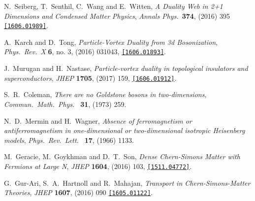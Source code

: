 \begin{thebibliography}{99}
  N.~Seiberg, T.~Senthil, C.~Wang and E.~Witten,
  {\it A Duality Web in 2+1 Dimensions and Condensed Matter Physics},
  {\it Annals Phys.}\  {\bf 374}, (2016) 395 
  \href{https://arxiv.org/abs/1606.01989}{\tt[1606.01989]}.
  
  A.~Karch and D.~Tong,
 {\it Particle-Vortex Duality from 3d Bosonization},
 {\it Phys.\ Rev.\ X} {\bf 6}, no. 3, (2016) 031043, 
  \href{https://arxiv.org/abs/1606.01893}{\tt[1606.01893]}.
  
  J.~Murugan and H.~Nastase,
  {\it Particle-vortex duality in topological insulators and superconductors},
  {\it JHEP} {\bf 1705},  (2017) 159,
  \href{https://arxiv.org/abs/1606.01912}{\tt[1606.01912]}.

  
  S.~R.~Coleman,
  {\it There are no Goldstone bosons in two-dimensions},
  {\it Commun.\ Math.\ Phys.\  } {\bf 31},  (1973) 259.

  N.~D.~Mermin and H.~Wagner,
  {\it Absence of ferromagnetism or antiferromagnetism in one-dimensional or two-dimensional isotropic Heisenberg models},
 {\it Phys.\ Rev.\ Lett.\ }  {\bf 17}, (1966) 1133.
 
  M.~Geracie, M.~Goykhman and D.~T.~Son,
  {\it Dense Chern-Simons Matter with Fermions at Large N},
  {\it JHEP} {\bf 1604}, (2016) 103, 
  \href{https://arxiv.org/abs/1511.04772}{\tt[1511.04772]}.
  
  G.~Gur-Ari, S.~A.~Hartnoll and R.~Mahajan,
  {\it Transport in Chern-Simons-Matter Theories},
  {\it JHEP} {\bf 1607}, (2016) 090 
  \href{https://arxiv.org/abs/1605.01122}{\tt[1605.01122]}.
 

\end{thebibliography}
